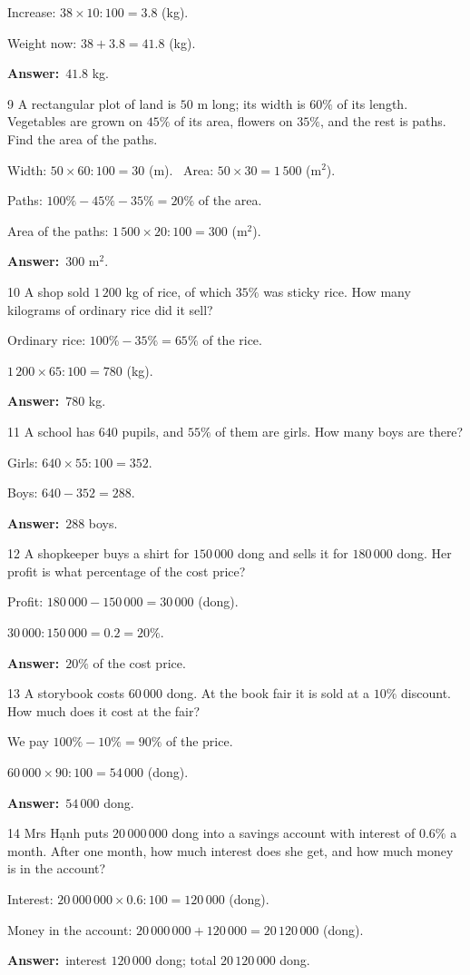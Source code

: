 \documentclass[11pt]{article}
\newif\ifsol \solfalse
\providecommand{\AnsWord}{Đáp số}
\newcommand{\dapso}[1]{\par\textbf{\AnsWord:}\ #1}
\newcommand{\probsol}[1]{%
  \begin{lrbox}{\solmeasure}\begin{minipage}{\dimexpr\linewidth-24pt\relax}#1\end{minipage}\end{lrbox}%
  \ifsol
    \begin{solbox}#1\end{solbox}%
  \else
    \setlength{\solht}{\dimexpr\ht\solmeasure+\dp\solmeasure+0.85cm\relax}%
    \ifdim\solht<1.35cm\setlength{\solht}{1.35cm}\fi
    \begin{tcolorbox}[colback=white,colframe=Line,boxrule=0.8pt,arc=5pt,
      left=8pt,right=8pt,top=4pt,bottom=4pt,height=\solht]{\footnotesize\color{Slate}\itshape\WorkWord}\end{tcolorbox}%
  \fi}
\newcommand{\gap}{\vspace{0.3cm}}
\def\WorkWord{Your work:}
\def\AnsWord{Answer}
\begin{document}
\probsol{
Increase: $38\times10:100=3.8$ (kg).\par
Weight now: $38+3.8=41.8$ (kg).
\dapso{$41.8$ kg.}}
\gap
\begin{probbox}{9}{\relax}
A rectangular plot of land is $50$ m long; its width is $60\%$ of its length. Vegetables are grown on $45\%$ of its area, flowers on $35\%$, and the rest is paths. Find the area of the paths.
\end{probbox}
\probsol{
Width: $50\times60:100=30$ (m). \ Area: $50\times30=1\,500$ (m$^2$).\par
Paths: $100\%-45\%-35\%=20\%$ of the area.\par
Area of the paths: $1\,500\times20:100=300$ (m$^2$).
\dapso{$300$ m$^2$.}}
\gap
\begin{probbox}{10}{\relax}
A shop sold $1\,200$ kg of rice, of which $35\%$ was sticky rice. How many kilograms of ordinary rice did it sell?
\end{probbox}
\probsol{
Ordinary rice: $100\%-35\%=65\%$ of the rice.\par
$1\,200\times65:100=780$ (kg).
\dapso{$780$ kg.}}
\gap
\begin{probbox}{11}{\relax}
A school has $640$ pupils, and $55\%$ of them are girls. How many boys are there?
\end{probbox}
\probsol{
Girls: $640\times55:100=352$.\par
Boys: $640-352=288$.
\dapso{$288$ boys.}}
\gap
\begin{probbox}{12}{\relax}
A shopkeeper buys a shirt for $150\,000$ dong and sells it for $180\,000$ dong. Her profit is what percentage of the cost price?
\end{probbox}
\probsol{
Profit: $180\,000-150\,000=30\,000$ (dong).\par
$30\,000:150\,000=0.2=20\%$.
\dapso{$20\%$ of the cost price.}}
\gap
\begin{probbox}{13}{\relax}
A storybook costs $60\,000$ dong. At the book fair it is sold at a $10\%$ discount. How much does it cost at the fair?
\end{probbox}
\probsol{
We pay $100\%-10\%=90\%$ of the price.\par
$60\,000\times90:100=54\,000$ (dong).
\dapso{$54\,000$ dong.}}
\gap
\begin{probbox}{14}{\relax}
Mrs Hạnh puts $20\,000\,000$ dong into a savings account with interest of $0.6\%$ a month. After one month, how much interest does she get, and how much money is in the account?
\end{probbox}
\probsol{
Interest: $20\,000\,000\times0.6:100=120\,000$ (dong).\par
Money in the account: $20\,000\,000+120\,000=20\,120\,000$ (dong).
\dapso{interest $120\,000$ dong; total $20\,120\,000$ dong.}}
\end{document}

